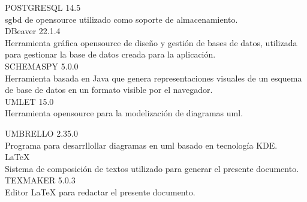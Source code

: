 
 POSTGRESQL 14.5\\
 \acrshort{sgbd} de \gls{opensource} utilizado como soporte de almacenamiento.
 \\
 
 DBeaver 22.1.4\\
 Herramienta gráfica \gls{opensource} de diseño y gestión de bases de datos, utilizada para gestionar la base de datos creada para la aplicación.
 \\

 SCHEMASPY 5.0.0\\
 Herramienta basada en Java que genera representaciones visuales de un esquema de base de datos en un formato visible por el navegador.
 \\ 
 
 UMLET 15.0\\
 Herramienta \gls{opensource} para la modelización de diagramas \acrshort{uml}.


 
 UMBRELLO 2.35.0\\
 Programa para desarrllollar diagramas en \acrfull{uml} basado en tecnología KDE.
 \\
 
 \LaTeX{}\\
 Sistema de composición de textos utilizado para generar el presente documento.
 \\ 
 
 TEXMAKER 5.0.3\\
 Editor \LaTeX{} para redactar el presente documento.
 
 
 

	
